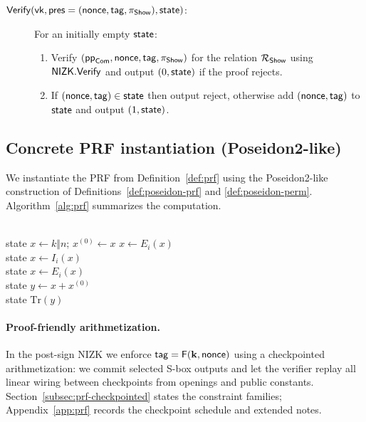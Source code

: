 \begin{description}
\item[$\mathsf{Verify}(\mathsf{vk},\mathsf{pres}=(\mathsf{nonce},\mathsf{tag},\pi_{\mathsf{Show}}),\mathsf{state})$:] For an initially empty
\(\mathsf{state}\):
\begin{enumerate}
\item Verify \((\mathsf{pp}_{\mathsf{Com}},\mathsf{nonce},\mathsf{tag},\pi_{\mathsf{Show}})\) for the relation \(\mathcal{R}_{\mathsf{Show}}\) using
\(\mathsf{NIZK}.\mathsf{Verify}\) and output \((0,\mathsf{state})\) if the proof rejects.
\item If \((\mathsf{nonce},\mathsf{tag})\in \mathsf{state}\) then output reject, otherwise add \((\mathsf{nonce},\mathsf{tag})\) to
\(\mathsf{state}\) and output \((1,\mathsf{state})\).
\end{enumerate}
\end{description}

\subsection{Concrete PRF instantiation (Poseidon2-like)}
\label{subsec:poseidon-prf}

\providecommand{\Tr}{\mathrm{Tr}}

We instantiate the PRF from Definition~\ref{def:prf} using the Poseidon2-like construction of
Definitions~\ref{def:poseidon-prf} and \ref{def:poseidon-perm}. Algorithm~\ref{alg:prf} summarizes the computation.

\begin{algorithm}[H]
\caption{$\PRF(k,n)$ (Poseidon2-like with feed-forward + truncation)}
\label{alg:prf}
\begin{algorithmic}[1]
\\state $x \gets k\Vert n$; $x^{(0)}\gets x$
 \state $x\gets E_i(x)$ \EndFor
{} \\state $x\gets I_i(x)$ \EndFor
{} \\state $x\gets E_i(x)$ \EndFor
\\state $y \gets x + x^{(0)}$ 
\\state \Return $\Tr(y)$ 
\end{algorithmic}
\end{algorithm}

\paragraph{Proof-friendly arithmetization.}
In the post-sign NIZK we enforce $\mathsf{tag}=\mathsf{F}(\mathbf{k},\mathsf{nonce})$ using a checkpointed arithmetization: we commit
selected S-box outputs and let the verifier replay all linear wiring between checkpoints from openings and public
constants. Section~\ref{subsec:prf-checkpointed} states the constraint families; Appendix~\ref{app:prf} records the
checkpoint schedule and extended notes.


